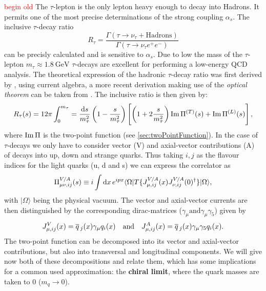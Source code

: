 \documentclass[../../index.tex]{subfiles}
\begin{document}
\textcolor{red}{begin old}
The $\tau$-lepton is the only lepton heavy enough to decay into Hadrons. It
permits one of the most precise determinations of the strong coupling $\alpha_s$.
The inclusive $\tau$-decay ratio
\begin{equation}
  \label{eq:inclusiveRatio}
  R_\tau = \frac{\Gamma(\tau \to \nu_\tau + \text{Hadrons})}{\Gamma(\tau \to \nu_\tau e^+ e^-)}
\end{equation}
can be precisly calculated and is sensitive to $\alpha_s$. Due to low the mass of
the $\tau$-lepton $m_\tau\approx\SI{1.8}{\giga\eV}$ $\tau$-decays are excellent
for performing a low-energy QCD analysis.
The theoretical expression of the hadronic $\tau$-decay ratio was first derived
by \cite{Tsai1971}, using current algebra, a more recent derivation making use
of the \textit{optical theorem} can be taken from \cite{Schwab2002}. The
inclusive ratio is then given by:
\begin{equation}
  \label{eq:hadronicTauDecayRatio}
  R_\tau(s) = 12 \pi \int_0^{m_\tau} = \frac{\dif s}{m_\tau^2}
  \left( 1 - \frac{s}{m_\tau^2} \right)
  \left[ \left( 1 + 2 \frac{s}{m_\tau^2} \right) \Ima \Pi^{(T)}(s) + \Ima \Pi^{(L)}(s) \right],
\end{equation}
where $\operatorname{Im} \Pi$ is the two-point function (see \cref{sec:twoPointFunction}). In
the case of $\tau$-decays we only have to consider vector (V) and axial-vector
contributions (A) of decays into up, down and strange quarks. Thus taking $i,j$ as the flavour
indices for the light quarks (u, d and s) we can express the correlator as
\begin{equation}
  \Pi_{\mu\nu,ij}^{V/A}(s) \equiv i \int \dif x \,e^{ipx} \langle \Omega | T \{ J_{\mu,ij}^{V/A}(x) J_{\nu,ij}^{V/A}(0)^\dagger \} | \Omega \rangle,
\end{equation}
with $|\Omega\rangle$ being the physical vacuum. The vector and axial-vector
currents are then distinguished by the corresponding dirac-matrices
($\gamma_\mu \text{and} \gamma_\mu \gamma_5$) given by
\begin{equation}
  J_{\mu,ij}^{V}(x) = \overline{q}\,_j(x) \gamma_\mu q_i(x) \quad \text{and} \quad J_{\mu,ij}^{A}(x) = \overline{q}\,_j(x) \gamma_\mu \gamma_5 q_i(x).
\end{equation}
The two-point function can be decomposed into its vector and axial-vector
contributions, but also into transversal and longitudinal components. We will
give now both of these decompositions and relate them, which has some
implications for a common used approximation: the \textbf{chiral limit}, where
the quark masses are taken to 0 ($m_q \to 0$).
\end{document}

